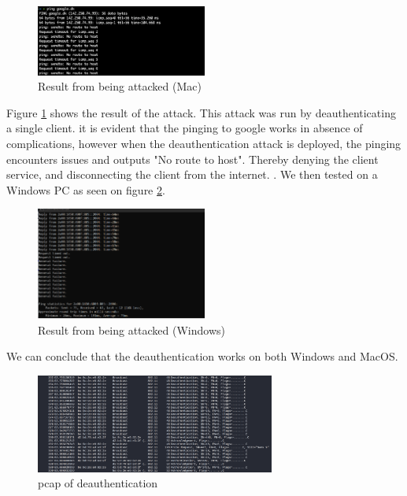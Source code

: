 \begin{figure}[!htbp]
     \centering
     \includegraphics[width=0.5\textwidth]{Latex-Files/Billeder/Tests/deauth_ping.png}
     \caption{Result from being attacked (Mac)}
     \label{Test2}
\end{figure}

Figure \ref{Test2} shows the result of the attack. This attack was run by deauthenticating a single client. it is evident that the pinging to google works in absence of complications, however when the deauthentication attack is deployed, the pinging encounters issues and outputs "No route to host". Thereby denying the client service, and disconnecting the client from the internet. . We then tested on a Windows PC as seen on figure \ref{Test3}.

\begin{figure}[!htbp]
    \centering
    \includegraphics[width=0.5\textwidth]{Latex-Files/Billeder/Tests/Deauth virker.png}
    \caption{Result from being attacked (Windows)}
    \label{Test3}
\end{figure}

We can conclude that the deauthentication works on both Windows and MacOS. 

\begin{figure}[!htbp]
    \centering
    \includegraphics[width=0.7\textwidth]{Latex-Files/Billeder/Tests/deauth_pcap.png}
    \caption{pcap of deauthentication}
    \label{deauth_pcap}
\end{figure}

